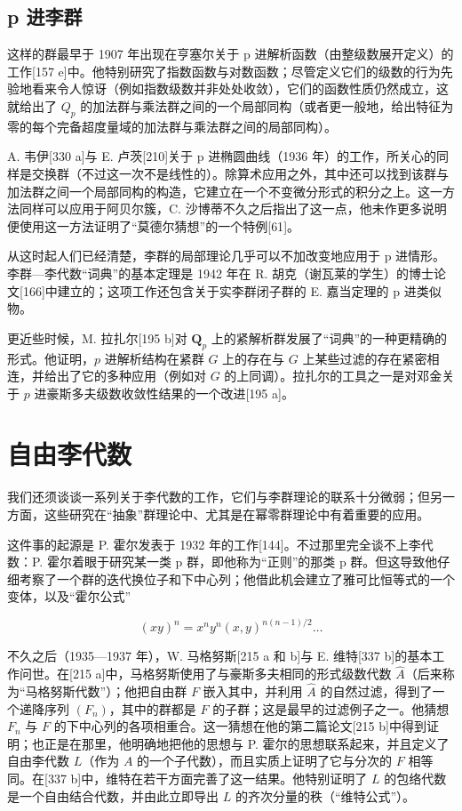 \subsection{p 进李群}

这样的群最早于 1907 年出现在亨塞尔关于 p 进解析函数（由整级数展开定义）的工作{[}157 e{]}中。他特别研究了指数函数与对数函数；尽管定义它们的级数的行为先验地看来令人惊讶（例如指数级数并非处处收敛），它们的函数性质仍然成立，这就给出了 \(Q_{p}\) 的加法群与乘法群之间的一个局部同构（或者更一般地，给出特征为零的每个完备超度量域的加法群与乘法群之间的局部同构）。

A. 韦伊{[}330 a{]}与 E. 卢茨{[}210{]}关于 p 进椭圆曲线（1936 年）的工作，所关心的同样是交换群（不过这一次不是线性的）。除算术应用之外，其中还可以找到该群与加法群之间一个局部同构的构造，它建立在一个不变微分形式的积分之上。这一方法同样可以应用于阿贝尔簇，C. 沙博蒂不久之后指出了这一点，他未作更多说明便使用这一方法证明了“莫德尔猜想”的一个特例{[}61{]}。

从这时起人们已经清楚，李群的局部理论几乎可以不加改变地应用于 p 进情形。李群—李代数“词典”的基本定理是 1942 年在 R. 胡克（谢瓦莱的学生）的博士论文{[}166{]}中建立的；这项工作还包含关于实李群闭子群的 E. 嘉当定理的 p 进类似物。

更近些时候，M. 拉扎尔{[}195 b{]}对 \(\mathbf{Q}_p\) 上的紧解析群发展了“词典”的一种更精确的形式。他证明，\(p\) 进解析结构在紧群 \(G\) 上的存在与 \(G\) 上某些过滤的存在紧密相连，并给出了它的多种应用（例如对 \(G\) 的上同调）。拉扎尔的工具之一是对邓金关于 \(p\) 进豪斯多夫级数收敛性结果的一个改进{[}195 a{]}。

\section{自由李代数}

我们还须谈谈一系列关于李代数的工作，它们与李群理论的联系十分微弱；但另一方面，这些研究在“抽象”群理论中、尤其是在幂零群理论中有着重要的应用。

这件事的起源是 P. 霍尔发表于 1932 年的工作{[}144{]}。不过那里完全谈不上李代数：P. 霍尔着眼于研究某一类 p 群，即他称为“正则”的那类 p 群。但这导致他仔细考察了一个群的迭代换位子和下中心列；他借此机会建立了雅可比恒等式的一个变体，以及“霍尔公式”

\[
(x y) ^ {n} = x ^ {n} y ^ {n} (x, y) ^ {n (n - 1) / 2} \dots
\]

不久之后（1935—1937 年），W. 马格努斯{[}215 a 和 b{]}与 E. 维特{[}337 b{]}的基本工作问世。在{[}215 a{]}中，马格努斯使用了与豪斯多夫相同的形式级数代数 \(\hat{A}\)（后来称为“马格努斯代数”）；他把自由群 \(F\) 嵌入其中，并利用 \(\hat{A}\) 的自然过滤，得到了一个递降序列 \((F_n)\)，其中的群都是 \(F\) 的子群；这是最早的过滤例子之一。他猜想 \(F_n\) 与 \(F\) 的下中心列的各项相重合。这一猜想在他的第二篇论文{[}215 b{]}中得到证明；也正是在那里，他明确地把他的思想与 P. 霍尔的思想联系起来，并且定义了自由李代数 \(L\)（作为 \(A\) 的一个子代数），而且实质上证明了它与分次的 \(F\) 相等同。在{[}337 b{]}中，维特在若干方面完善了这一结果。他特别证明了 \(L\) 的包络代数是一个自由结合代数，并由此立即导出 \(L\) 的齐次分量的秩（“维特公式”）。

